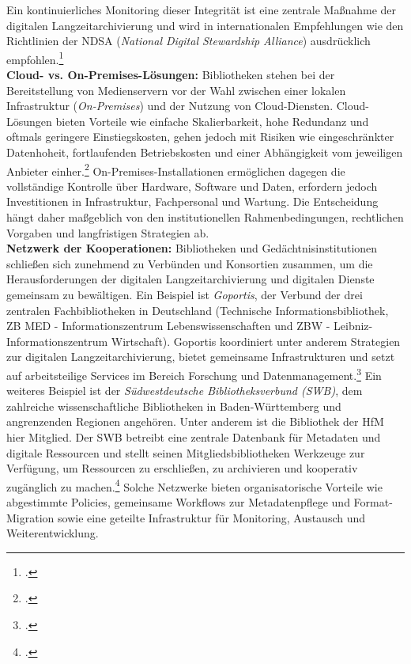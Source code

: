\documentclass[12pt,a4paper]{report}
\begin{document}
Ein kontinuierliches Monitoring dieser Integrität ist eine zentrale Maßnahme der digitalen Langzeitarchivierung 
und wird in internationalen Empfehlungen wie den Richtlinien der NDSA (\emph{National Digital Stewardship Alliance}) ausdrücklich empfohlen.\footcite[Vgl.][siehe Levels of Digital Preservation V2.0 Matrix und Curatorial Guidance]{ndsa_fixity}
\\
\newline
\textbf{Cloud- vs. On-Premises-Lösungen:}  
Bibliotheken stehen bei der Bereitstellung von Medienservern vor der Wahl zwischen einer lokalen Infrastruktur (\emph{On-Premises}) und der Nutzung von Cloud-Diensten.  
Cloud-Lösungen bieten Vorteile wie einfache Skalierbarkeit, hohe Redundanz und oftmals geringere Einstiegskosten, gehen jedoch mit Risiken wie eingeschränkter Datenhoheit, fortlaufenden Betriebskosten und einer Abhängigkeit vom jeweiligen Anbieter einher.\footcite[Vgl.][S.~1]{paletta2015cloud}  
On-Premises-Installationen ermöglichen dagegen die vollständige Kontrolle über Hardware, Software und Daten, erfordern jedoch Investitionen in Infrastruktur, Fachpersonal und Wartung.  
Die Entscheidung hängt daher maßgeblich von den institutionellen Rahmenbedingungen, rechtlichen Vorgaben und langfristigen Strategien ab.
\\
\newline
\textbf{Netzwerk der Kooperationen:}  
Bibliotheken und Gedächtnisinstitutionen schließen sich zunehmend zu Verbünden und Konsortien zusammen, 
um die Herausforderungen der digitalen Langzeitarchivierung und digitalen Dienste gemeinsam zu bewältigen.  
Ein Beispiel ist \emph{Goportis}, der Verbund der drei zentralen Fachbibliotheken in Deutschland 
(Technische Informationsbibliothek, ZB MED - Informationszentrum Lebenswissenschaften und ZBW - Leibniz-Informationszentrum Wirtschaft). 
Goportis koordiniert unter anderem Strategien zur digitalen Langzeitarchivierung, 
bietet gemeinsame Infrastrukturen und setzt auf arbeitsteilige Services im Bereich Forschung und Datenmanagement.\footcite[Vgl.][]{wikipedia_goportis}  
Ein weiteres Beispiel ist der \emph{Südwestdeutsche Bibliotheksverbund (SWB)}, dem zahlreiche wissenschaftliche Bibliotheken in Baden-Württemberg 
und angrenzenden Regionen angehören. Unter anderem ist die Bibliothek der HfM hier Mitglied. 
Der SWB betreibt eine zentrale Datenbank für Metadaten und digitale Ressourcen und stellt seinen Mitgliedsbibliotheken Werkzeuge zur Verfügung, 
um Ressourcen zu erschließen, zu archivieren und kooperativ zugänglich zu machen.\footcite[Vgl.][]{swb}  
Solche Netzwerke bieten organisatorische Vorteile wie abgestimmte Policies, gemeinsame Workflows zur Metadatenpflege 
und Format-Migration sowie eine geteilte Infrastruktur für Monitoring, Austausch und Weiterentwicklung.
\end{document}
